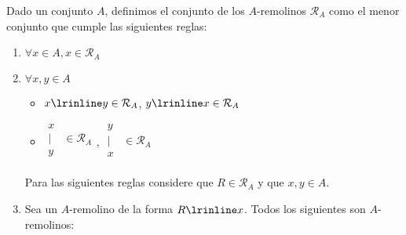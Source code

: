 Dado un conjunto $A$, definimos el conjunto de los $A$-remolinos $\mathcal{R}_A$
como el menor conjunto que cumple las siguientes reglas:

\begin{enumerate}
    \item $\forall x \in A, x \in \mathcal{R}_A$

    \item $\forall x, y \in A$

    \begin{itemize}
        \item $ x \lrinline y \in \mathcal{R}_A$, $ y \lrinline x \in \mathcal{R}_A$

        \item
           $\begin{matrix}
           x \\
           | & \in \mathcal{R}_A\\
           y \\
         \end{matrix}$,
         $\begin{matrix}
         y \\
         | & \in \mathcal{R}_A\\
         x \\
       \end{matrix}$
    \end{itemize}

    Para las siguientes reglas considere que $R \in \mathcal{R}_A$ y que $x,y \in A$.
    \item Sea un $A$-remolino de la forma $R \lrinline x$. Todos los siguientes son $A$-remolinos:


\end{enumerate}

